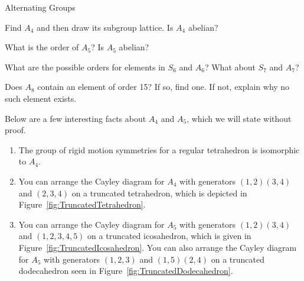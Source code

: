 \begin{section}{Alternating Groups}
\begin{problem}
Find $A_4$ and then draw its subgroup lattice. Is $A_4$ abelian?
\end{problem}

\begin{problem}
What is the order of $A_5$?  Is $A_5$ abelian?
\end{problem}

\begin{problem}
What are the possible orders for elements in $S_6$ and $A_6$?  What about $S_7$ and $A_7$?
\end{problem}

\begin{problem}
Does $A_8$ contain an element of order 15?  If so, find one.  If not, explain why no such element exists.
\end{problem}

\begin{remark}
Below are a few interesting facts about $A_4$ and $A_5$, which we will state without proof.
\begin{enumerate}[label=\rm{(\alph*)}]
\item The group of rigid motion symmetries for a regular tetrahedron is isomorphic to $A_4$.
\item You can arrange the Cayley diagram for $A_4$ with generators $(1,2)(3,4)$ and $(2,3,4)$ on a truncated tetrahedron, which is depicted in Figure~\ref{fig:TruncatedTetrahedron}.
\item You can arrange the Cayley diagram for $A_5$ with generators $(1,2)(3,4)$ and $(1,2,3,4,5)$ on a truncated icosahedron, which is given in Figure~\ref{fig:TruncatedIcosahedron}.  You can also arrange the Cayley diagram for $A_5$ with generators $(1,2,3)$ and $(1,5)(2,4)$ on a truncated dodecahedron seen in Figure~\ref{fig:TruncatedDodecahedron}. 
\end{enumerate}
\end{remark}


\end{section}
